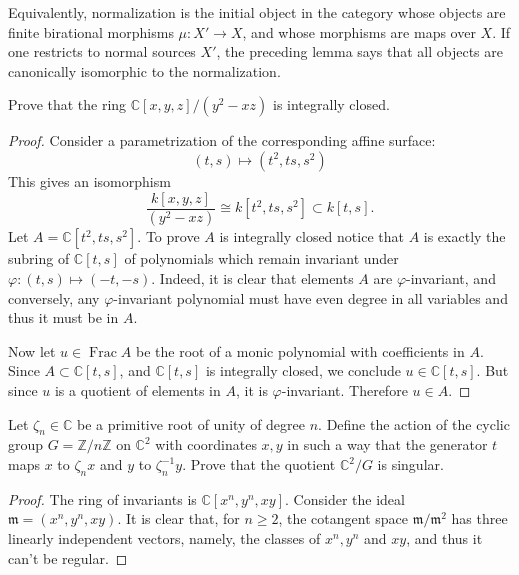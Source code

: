 \noindent
Equivalently, normalization is the initial
object in the category whose objects are
finite birational morphisms
$\mu:X'\to X$, and whose morphisms are maps
over $X$.
If one restricts to normal sources $X'$,
the preceding lemma says that all objects
are canonically isomorphic to the
normalization.

\begin{exercise}
\label{exercise-normal-surface}
Prove that the ring 
$\mathbb{C}[x,y,z]/(y^2-xz)$
is integrally closed.
\end{exercise}

\begin{proof}
Consider a parametrization of the
corresponding affine surface:
$$
(t,s) \longmapsto (t^2,t s,s^2)
$$
This gives an isomorphism
$$
\frac{k[x,y,z]}{(y^2-xz)}
\cong
k[t^2,t s,s^2] \subset k[t,s].
$$
Let $A=\mathbb{C}[t^2,ts,s^2]$.
To prove $A$ is integrally closed
notice that $A$ is exactly the subring
of $\mathbb{C}[t,s]$ of polynomials which
remain invariant under
$\varphi:(t,s)\mapsto (-t,-s)$. Indeed,
it is clear that elements $A$ are 
$\varphi$-invariant, and conversely,
any $\varphi$-invariant polynomial
must have even degree in all variables
and thus it must be in $A$.

Now let $u \in \operatorname{Frac}A$
be the root of a monic polynomial
with coefficients in $A$.
Since $A \subset \mathbb{C}[t,s]$,
and $\mathbb{C}[t,s]$ is integrally closed,
we conclude $u \in \mathbb{C}[t,s]$.
But since $u$ is a quotient of elements
in $A$, it is $\varphi$-invariant.
Therefore $u \in A$.
\end{proof}

\begin{exercise}
\label{exercise-quotient-not-smooth}
Let $\zeta_n \in \mathbb{C}$
be a primitive root of unity
of degree $n$.
Define the action of the cyclic group
$G = \mathbb{Z}/n\mathbb{Z}$ on $\mathbb{C}^2$
with coordinates $x,y$
in such a way that the generator
$t$ maps $x$ to $\zeta_nx$ and
$y$ to $\zeta_n^{-1}y$.
Prove that the quotient $\mathbb{C}^2/G$
is singular.
\end{exercise}

\begin{proof}
The ring of invariants is
$\mathbb{C}[x^n,y^n,xy]$.
Consider the ideal 
$\mathfrak{m}=(x^n,y^n,xy)$.
It is clear that, for $n\geq 2$,
the cotangent space
$\mathfrak{m}/\mathfrak{m}^2$
has three linearly independent vectors,
namely, the classes of
$x^n,y^n$ and $xy$, and thus it can't
be regular.
\end{proof}
 

